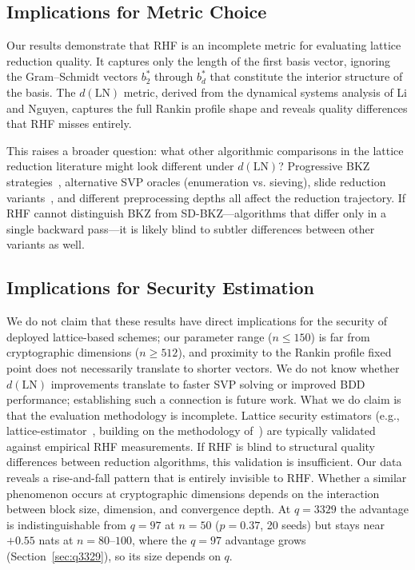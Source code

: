 \documentclass[journal=cic,version=preprint]{iacrj}
\begin{document}
\subsection{Implications for Metric Choice}

Our results demonstrate that RHF is an incomplete metric for evaluating lattice reduction quality. It captures only the length of the first basis vector, ignoring the Gram--Schmidt vectors $b^*_2$ through $b^*_d$ that constitute the interior structure of the basis. The $d(\mathrm{LN})$ metric, derived from the dynamical systems analysis of Li and Nguyen, captures the full Rankin profile shape and reveals quality differences that RHF misses entirely.

This raises a broader question: what other algorithmic comparisons in the lattice reduction literature might look different under $d(\mathrm{LN})$? Progressive BKZ strategies~\cite{EC:AWHT16}, alternative SVP oracles (enumeration vs. sieving), slide reduction variants~\cite{C:ALNS20}, and different preprocessing depths all affect the reduction trajectory. If RHF cannot distinguish BKZ from SD-BKZ---algorithms that differ only in a single backward pass---it is likely blind to subtler differences between other variants as well.

\subsection{Implications for Security Estimation}

We do not claim that these results have direct implications for the security of deployed lattice-based schemes; our parameter range ($n\leq 150$) is far from cryptographic dimensions ($n\geq 512$), and proximity to the Rankin profile fixed point does not necessarily translate to shorter vectors. We do not know whether $d(\mathrm{LN})$ improvements translate to faster SVP solving or improved BDD performance; establishing such a connection is future work. What we do claim is that the evaluation methodology is incomplete. Lattice security estimators (e.g., lattice-estimator~\cite{LatticeEstimator}, building on the methodology of~\cite{JMC:AlbPlaSco15}) are typically validated against empirical RHF measurements. If RHF is blind to structural quality differences between reduction algorithms, this validation is insufficient. Our data reveals a rise-and-fall pattern that is entirely invisible to RHF. Whether a similar phenomenon occurs at cryptographic dimensions depends on the interaction between block size, dimension, and convergence depth. At $q=3329$ the advantage is indistinguishable from $q=97$ at $n=50$ ($p=0.37$, 20 seeds) but stays near $+0.55$ nats at $n=80$--$100$, where the $q=97$ advantage grows (Section~\ref{sec:q3329}), so its size depends on $q$.
\end{document}
